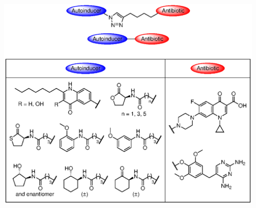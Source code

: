 \documentclass[10pt,a4paper]{article}
\begin{document}
\begin{scheme}[H]
	\begin{center}
		\includegraphics[width=0.8\linewidth]{Summary_1}
	\end{center}
\end{scheme}
\end{document}
